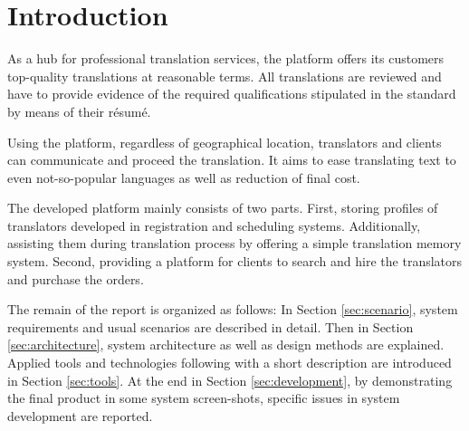 \section{Introduction}
As a hub for professional translation services, the platform offers its customers top-quality translations at reasonable terms. All translations are reviewed and have to provide evidence of the required qualifications stipulated in the standard by means of their résumé.

Using the platform, regardless of geographical location, translators and clients can communicate and proceed the translation. It aims to ease translating text to even not-so-popular languages as well as reduction of final cost.

The developed platform mainly consists of two parts. First, storing profiles of translators developed in registration and  scheduling systems. Additionally, assisting them during translation process by offering a simple translation memory system. Second, providing a platform for clients to search and hire the translators and purchase the orders.

The remain of the report is organized as follows: In Section \ref{sec:scenario}, system requirements and usual scenarios are described in detail. Then in Section \ref{sec:architecture}, system architecture as well as design methods are explained. Applied tools and technologies following with a short description are introduced in Section \ref{sec:tools}. At the end in Section \ref{sec:development}, by demonstrating the final product in some system screen-shots, specific issues in system development are reported.